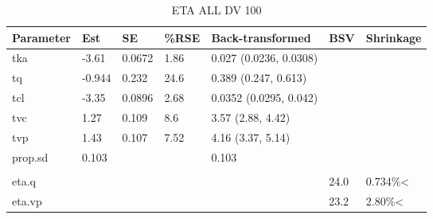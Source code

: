 \begin{table}
\centering\centering
\caption{ETA ALL DV 100}
\centering
\fontsize{8}{10}\selectfont
\begin{tabular}[t]{lllllll}
\toprule
\textbf{Parameter} & \textbf{Est} & \textbf{SE} & \textbf{\%RSE} & \textbf{Back-transformed} & \textbf{BSV} & \textbf{Shrinkage}\\
\midrule
tka & -3.61 & 0.0672 & 1.86 & 0.027 (0.0236, 0.0308) &  & \\
\midrule
tq & -0.944 & 0.232 & 24.6 & 0.389 (0.247, 0.613) &  & \\
\midrule
tcl & -3.35 & 0.0896 & 2.68 & 0.0352 (0.0295, 0.042) &  & \\
\midrule
tvc & 1.27 & 0.109 & 8.6 & 3.57 (2.88, 4.42) &  & \\
\midrule
tvp & 1.43 & 0.107 & 7.52 & 4.16 (3.37, 5.14) &  & \\
\midrule
prop.sd & 0.103 &  &  & 0.103 &  & \\
\midrule\\
eta.q &  &  &  &  & 24.0 & 0.734\%<\\
\midrule
eta.vp &  &  &  &  & 23.2 & 2.80\%<\\
\bottomrule
\end{tabular}
\end{table}